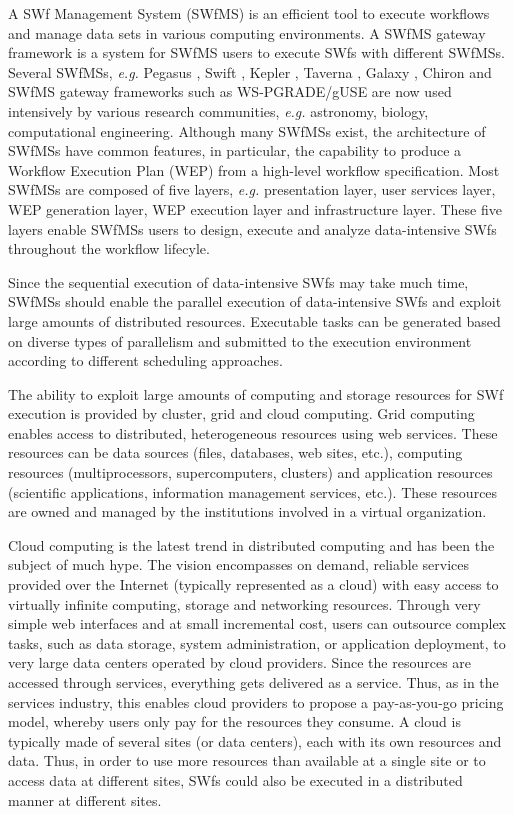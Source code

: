 A SWf Management System (SWfMS)
is an efficient tool to execute workflows and manage data sets in
various computing environments. 
A SWfMS gateway framework is a system for SWfMS users to execute SWfs with different SWfMSs.
Several SWfMSs, \textit{e.g.} Pegasus \cite{Deelman2005,Deelman2014}, Swift \cite{Zhao2007},
Kepler \cite{Altintas2004}, Taverna \cite{Oinn2004}, Galaxy \cite{Goecks2010}, Chiron \cite{Ogasawara2013} and SWfMS gateway frameworks such as WS-PGRADE/gUSE \cite{Kacsuk2012} are now used intensively by various research communities, \textit{e.g.} astronomy,
biology, computational engineering. 
Although many SWfMSs exist, the architecture of SWfMSs have common features, in particular, the capability to produce a Workflow Execution Plan (WEP) from a
high-level workflow specification.
Most SWfMSs are composed of five layers, \textit{e.g.} presentation layer, user
services layer, WEP generation layer, WEP
execution layer and infrastructure layer. These five layers enable
SWfMSs users to design, execute and analyze data-intensive SWfs throughout the workflow lifecyle.

Since the sequential execution of
data-intensive SWfs may take much time, 
SWfMSs should enable the parallel execution of data-intensive SWfs and exploit large amounts of distributed resources.
Executable tasks can be generated based on diverse types of parallelism
and submitted to the execution environment according to different
scheduling approaches.

The ability to exploit large amounts of computing and storage
resources for SWf execution is provided by cluster, grid and
cloud computing.
Grid computing enables access to distributed, heterogeneous resources
using web services. These resources can be data sources (files,
databases, web sites, etc.), computing resources (multiprocessors, supercomputers,
clusters) and application resources (scientific applications, information management
services, etc.).
These resources are owned and managed by the institutions involved
in a virtual organization.

Cloud computing is the latest trend in distributed computing and has been the
subject of much hype. The vision encompasses on demand, reliable services provided
over the Internet (typically represented as a cloud) with easy access to virtually
infinite computing, storage and networking resources. Through very simple web
interfaces and at small incremental cost, users can outsource complex tasks, such
as data storage, system administration, or application deployment, to very large
data centers operated by cloud providers.
Since the resources are accessed through services, everything gets delivered as a
service. Thus, as in the services industry, this enables cloud providers to propose a
pay-as-you-go pricing model, whereby users only pay for the resources
they consume.
A  cloud is typically made of several sites (or data centers), each
with its own resources and data. Thus, in order to use more resources than
available at a single site or to access data at different sites, SWfs
could also be executed in a distributed manner at different sites.


